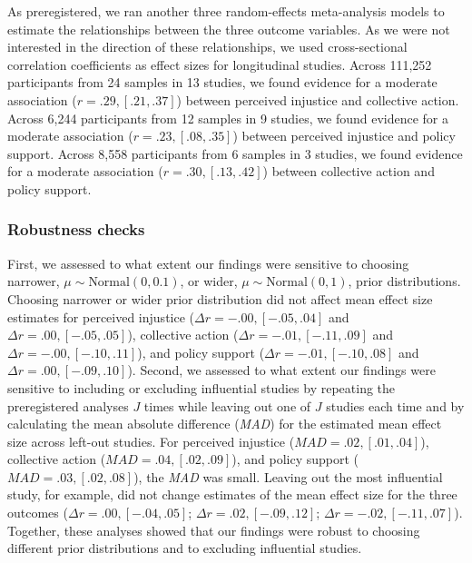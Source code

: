 \documentclass[
]{article}
\begin{document}
As preregistered, we ran another three random-effects meta-analysis
models to estimate the relationships between the three outcome
variables. As we were not interested in the direction of these
relationships, we used cross-sectional correlation coefficients as
effect sizes for longitudinal studies. Across 111,252 participants from
24 samples in 13 studies, we found evidence for a moderate association
(\(r = .29, [.21, .37]\)) between perceived injustice and collective
action. Across 6,244 participants from 12 samples in 9 studies, we found
evidence for a moderate association (\(r = .23, [.08, .35]\)) between
perceived injustice and policy support. Across 8,558 participants from 6
samples in 3 studies, we found evidence for a moderate association
(\(r = .30, [.13, .42]\)) between collective action and policy support.

\hypertarget{robustness-checks}{%
\subsubsection{Robustness checks}\label{robustness-checks}}

First, we assessed to what extent our findings were sensitive to
choosing narrower, \(\mu \sim \text{Normal}(0, 0.1)\), or wider,
\(\mu \sim \text{Normal}(0, 1)\), prior distributions. Choosing narrower
or wider prior distribution did not affect mean effect size estimates
for perceived injustice (\(\Delta r = -.00, [-.05, .04]\) and
\(\Delta r = .00, [-.05, .05]\)), collective action
(\(\Delta r = -.01, [-.11, .09]\) and \(\Delta r = -.00, [-.10, .11]\)),
and policy support (\(\Delta r = -.01, [-.10, .08]\) and
\(\Delta r = .00, [-.09, .10]\)). Second, we assessed to what extent our
findings were sensitive to including or excluding influential studies by
repeating the preregistered analyses \(J\) times while leaving out one
of \(J\) studies each time and by calculating the mean absolute
difference (\emph{MAD}) for the estimated mean effect size across
left-out studies. For perceived injustice
(\(\textit{MAD} = .02, [.01, .04]\)), collective action
(\(\textit{MAD} = .04, [.02, .09]\)), and policy support
(\(\textit{MAD} = .03, [.02, .08]\)), the \emph{MAD} was small. Leaving
out the most influential study, for example, did not change estimates of
the mean effect size for the three outcomes
(\(\Delta r = .00, [-.04, .05]\); \(\Delta r = .02, [-.09, .12]\);
\(\Delta r = -.02, [-.11, .07]\)). Together, these analyses showed that
our findings were robust to choosing different prior distributions and
to excluding influential studies.
\end{document}
